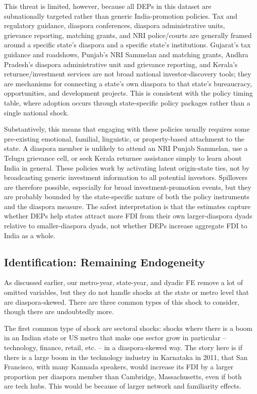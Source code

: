 \documentclass[12pt]{article}
\let\oldsubsection\subsection
\renewcommand{\subsection}{\FloatBarrier\oldsubsection}
\begin{document}
This threat is limited, however, because all DEPs in this dataset are subnationally targeted rather than generic India-promotion policies. Tax and regulatory guidance, diaspora conferences, diaspora administrative units, grievance reporting, matching grants, and NRI police/courts are generally framed around a specific state's diaspora and a specific state's institutions. Gujarat's tax guidance and roadshows, Punjab's NRI Sammelan and matching grants, Andhra Pradesh's diaspora administrative unit and grievance reporting, and Kerala's returnee/investment services are not broad national investor-discovery tools; they are mechanisms for connecting a state's own diaspora to that state's bureaucracy, opportunities, and development projects. This is consistent with the policy timing table, where adoption occurs through state-specific policy packages rather than a single national shock.

Substantively, this means that engaging with these policies usually requires some pre-existing emotional, familial, linguistic, or property-based attachment to the state. A diaspora member is unlikely to attend an NRI Punjab Sammelan, use a Telugu grievance cell, or seek Kerala returnee assistance simply to learn about India in general. These policies work by activating latent origin-state ties, not by broadcasting generic investment information to all potential investors. Spillovers are therefore possible, especially for broad investment-promotion events, but they are probably bounded by the state-specific nature of both the policy instruments and the diaspora measure. The safest interpretation is that the estimates capture whether DEPs help states attract more FDI from their own larger-diaspora dyads relative to smaller-diaspora dyads, not whether DEPs increase aggregate FDI to India as a whole.

\subsection{Identification: Remaining Endogeneity} \label{ss:endogeneity}

As discussed earlier, our metro-year, state-year, and dyadic FE remove a lot of omitted variables, but they do not handle shocks at the state or metro level that are diaspora-skewed. There are three common types of this shock to consider, though there are undoubtedly more.

The first common type of shock are sectoral shocks: shocks where there is a boom in an Indian state or US metro that make one sector grow in particular -- technology, finance, retail, etc. --  in a diaspora-skewed way. The story here is if there is a large boom in the technology industry in Karnataka in 2011, that San Francisco, with many Kannada speakers, would increase its FDI by a larger proportion per diaspora member than Cambridge, Massachusetts, even if both are tech hubs. This would be because of larger network and familiarity effects.
\end{document}
